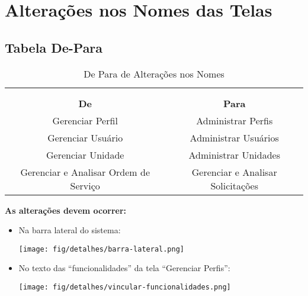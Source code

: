 \chapter{Alterações nos Nomes das Telas}
\label{detalhes:transicao-e-ajustes}

\section{Tabela De-Para}


\begin{table}[!h]
	\begin{center}
		\begin{tabular}{|c|c|}
			\hline
			\rowcolor{corCOULD!80} \multicolumn{2}{|c|}{\Large Nomes das Funcionalidades \normalsize} \\ \hline
			\rowcolor{corCOULD!80} \multicolumn{2}{|c|}{\Large Tabela ``De-Para'' de Alterações \normalsize} \\ 
			\rowcolor{corCOULD!80} \multicolumn{2}{|c|}{\large (Telas da Barra Lateral do Sistema) \normalsize} \\ \hline

			\rowcolor{lightgray}\textbf{De} & \textbf{Para} \\ \hline
			\rowcolor{cldfC1!40} \cellcolor{corCOULD!10} Gerenciar Perfil & Administrar Perfis  \\ \hline
			\rowcolor{cldfC1!40} \cellcolor{corCOULD!10} Gerenciar Usuário & Administrar Usuários  \\ \hline
			\rowcolor{cldfC1!40} \cellcolor{corCOULD!10} Gerenciar Unidade & Administrar Unidades  \\ \hline

			\rowcolor{cldfC1!40} \cellcolor{corCOULD!10} Gerenciar e Analisar Ordem de Serviço & Gerenciar e Analisar Solicitações  \\ \hline



		\end{tabular}    
		\caption{\label{tab:gerosassel:analise1} De Para de Alterações nos Nomes}
	\end{center}
\end{table}


\textbf{As alterações devem ocorrer:}

\begin{itemize}
	\item Na barra lateral do sistema:
	
	\centering
	\texttt{[image: fig/detalhes/barra-lateral.png]}
	
	
	\item No texto das ``funcionalidades'' da tela ``Gerenciar Perfis'':

	\centering
	\texttt{[image: fig/detalhes/vincular-funcionalidades.png]}
\end{itemize}

